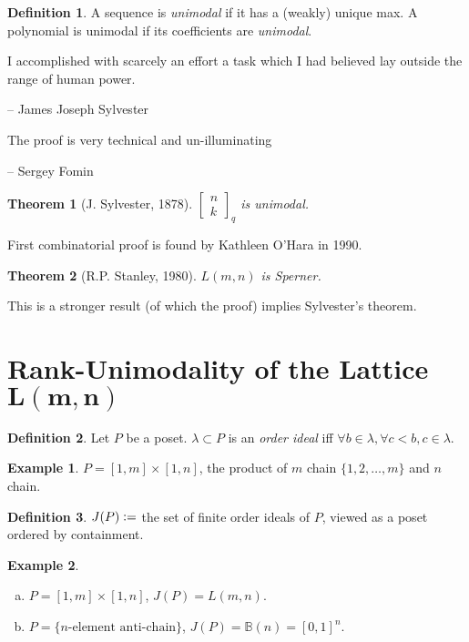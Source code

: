 \documentclass{report}
\newcommand{\qbin}[2]{\begin{bmatrix}{#1}\\ {#2}\end{bmatrix}_q}
\newcommand{\defeq}{\vcentcolon=}
\newtheorem{theorem}{Theorem}[section]
\theoremstyle{definition}
\newtheorem{definition}{Definition}[section]
\newtheorem{example}{Example}[section]
\theoremstyle{remark}
\numberwithin{equation}{section}
\newcommand{\fnl}{\parbox[t]{0\linewidth}{}}
\newcommand*\ttlmath[2]{\texorpdfstring{$\boldsymbol{#1}$}{#2}}
\begin{document}
\begin{definition}
    A sequence is \emph{unimodal} if it has a (weakly) unique max. A polynomial is unimodal if its coefficients are \emph{unimodal}.
\end{definition}

\epigraph{I accomplished with scarcely an effort a task which I had believed lay outside the range of human power.}{-- \textup{James Joseph Sylvester}}

\epigraph{The proof is very technical and un-illuminating}{-- \textup{Sergey Fomin}}

\begin{theorem}[J. Sylvester, 1878]\fnl
    $\qbin{n}{k}$ is unimodal.
\end{theorem}

First combinatorial proof is found by Kathleen O'Hara in 1990.

\begin{theorem}[R.P. Stanley, 1980]
    $L(m, n)$ is Sperner.
\end{theorem}
This is a stronger result (of which the proof) implies Sylvester's theorem.

\section{Rank-Unimodality of the Lattice \ttlmath{L(m, n)}{L(m, n)}}
\begin{definition}
    Let $P$ be a poset. $\lambda \subset P$ is an \emph{order ideal} iff $\forall b \in \lambda, \forall c < b, c \in \lambda$.
\end{definition}
\begin{example}
    $P = [1, m] \times [1, n]$, the product of $m$ chain $\{1, 2, \ldots, m\}$ and $n$ chain.
\end{example}

\begin{definition}
    $J(P) \defeq$ the set of finite order ideals of $P$, viewed as a poset ordered by containment.
\end{definition}
\begin{example}
    \begin{enumerate}[(a)]
        \item $P = [1, m] \times [1, n]$, $J(P) = L(m, n)$.
        \item $P = \{\text{$n$-element anti-chain}\}$, $J(P) = \mathbb{B}(n) = [0, 1]^n$.
    \end{enumerate}
\end{example}
\end{document}
